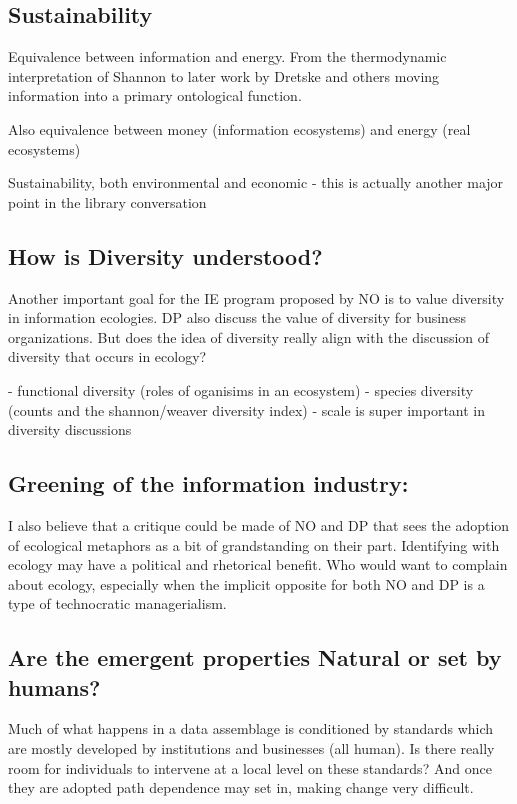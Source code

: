 \subsection{Sustainability}

Equivalence between information and energy. From the thermodynamic interpretation of Shannon to later work by Dretske and others moving information into a primary ontological function.

Also equivalence between money (information ecosystems) and energy (real ecosystems)

Sustainability, both environmental and economic - this is actually another major point in the library conversation



\subsection{How is Diversity understood?}

Another important goal for the IE program proposed by NO is to value diversity in information ecologies. DP also discuss the value of diversity for business organizations. But does the idea of diversity really align with the discussion of diversity that occurs in ecology?

- functional diversity (roles of oganisims in an ecosystem)
- species diversity (counts and the shannon/weaver diversity index)
- scale is super important in diversity discussions

\subsection{Greening of the information industry:}

I also believe that a critique could be made of NO and DP that sees the adoption of ecological metaphors as a bit of grandstanding on their part. Identifying with ecology may have a political and rhetorical benefit. Who would want to complain about ecology, especially when the implicit opposite for both NO and DP is a type of technocratic managerialism.

\subsection{Are the emergent properties Natural or set by humans?}

Much of what happens in a data assemblage is conditioned by standards which are mostly developed by institutions and businesses (all human). Is there really room for individuals to intervene at a local level on these standards? And once they are adopted path dependence may set in, making change very difficult.


